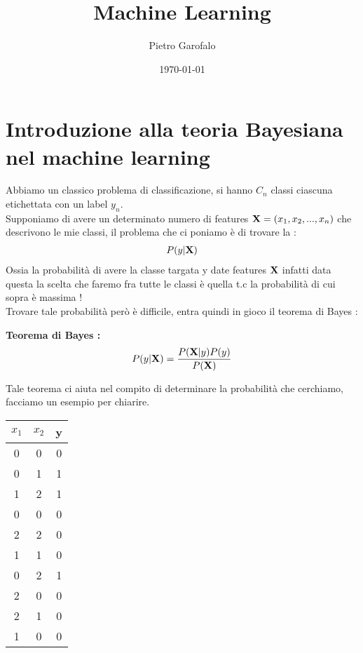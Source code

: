 \documentclass[a4paper, 12pt, twoside]{report}
\title{Machine Learning}
\author{Pietro Garofalo}
\date{\today}
\begin{document}
\maketitle
\newpage
\tableofcontents

\chapter{Introduzione alla teoria Bayesiana nel machine learning}
Abbiamo un classico problema di classificazione, si hanno $C_n$ classi ciascuna etichettata con un label $y_n$.\\
Supponiamo di avere un determinato numero di features $\vb{X} = \qty(x_1,x_2,...,x_n)$ che descrivono le mie classi, il problema che ci poniamo 
è di trovare la : 
\begin{align*}
        P(y|\vb{X}) 
\end{align*}
Ossia la probabilità di avere la classe targata y date features $\vb{X}$ infatti data questa la scelta che faremo 
fra tutte le classi è quella t.c la probabilità di cui sopra è massima ! \\
Trovare tale probabilità però è difficile, entra quindi in gioco il teorema di Bayes : \\
\begin{tcolorbox}[colback=red!5!white,colframe=red!50!black,title=ATTENZIONE !]
\textbf{Teorema di Bayes : }
\begin{align*}
    P(y|\vb{X}) = \frac{P(\vb{X}|y)P(y)}{P(\vb{X})}
\end{align*}
\end{tcolorbox}
Tale teorema ci aiuta nel compito di determinare la probabilità che cerchiamo, facciamo un esempio per chiarire.\\
\begin{center}
        \begin{tabular}{||c c c||}
                \hline
                $x_1$ & $x_2$ & y \\
                \hline\hline
                0 & 0 & 0 \\
                \hline
                0 & 1 & 1 \\
                \hline
                1 & 2 & 1 \\
                \hline 
                0 & 0 & 0 \\
                \hline
                2 & 2 & 0 \\
                \hline
                1 & 1 & 0 \\
                \hline
                0 & 2 & 1 \\
                \hline
                2 & 0 & 0 \\
                \hline
                2 & 1 & 0 \\
                \hline
                1 & 0 & 0 \\ 
                \hline
        \end{tabular}
\end{center}
\end{document}
